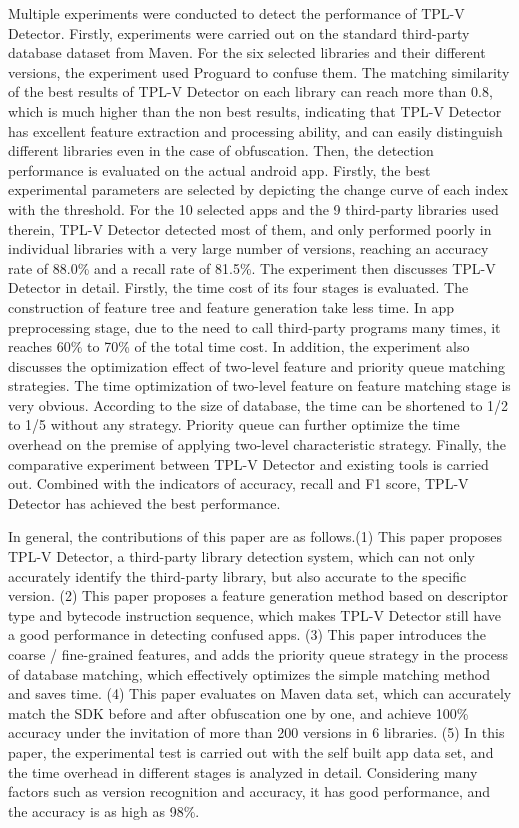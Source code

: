 \begin{digest}
Multiple experiments were conducted to detect the performance of TPL-V Detector. Firstly, experiments were carried out on the standard third-party database dataset from Maven. For the six selected libraries and their different versions, the experiment used Proguard to confuse them. The matching similarity of the best results of TPL-V Detector on each library can reach more than 0.8, which is much higher than the non best results, indicating that TPL-V Detector has excellent feature extraction and processing ability, and can easily distinguish different libraries even in the case of obfuscation. Then, the detection performance is evaluated on the actual android app. Firstly, the best experimental parameters are selected by depicting the change curve of each index with the threshold. For the 10 selected apps and the 9 third-party libraries used therein, TPL-V Detector detected most of them, and only performed poorly in individual libraries with a very large number of versions, reaching an accuracy rate of 88.0\% and a recall rate of 81.5\%. The experiment then discusses TPL-V Detector in detail. Firstly, the time cost of its four stages is evaluated. The construction of feature tree and feature generation take less time. In app preprocessing stage, due to the need to call third-party programs many times, it reaches 60\% to 70\% of the total time cost. In addition, the experiment also discusses the optimization effect of two-level feature and priority queue matching strategies. The time optimization of two-level feature on feature matching stage is very obvious. According to the size of database, the time can be shortened to 1/2 to 1/5 without any strategy. Priority queue can further optimize the time overhead on the premise of applying two-level characteristic strategy. Finally, the comparative experiment between TPL-V Detector and existing tools is carried out. Combined with the indicators of accuracy, recall and F1 score, TPL-V Detector has achieved the best performance.



In general, the contributions of this paper are as follows.(1) This paper proposes TPL-V Detector, a third-party library detection system, which can not only accurately identify the third-party library, but also accurate to the specific version. (2) This paper proposes a feature generation method based on descriptor type and bytecode instruction sequence, which makes TPL-V Detector still have a good performance in detecting confused apps. (3) This paper introduces the coarse / fine-grained features, and adds the priority queue strategy in the process of database matching, which effectively optimizes the simple matching method and saves time. (4) This paper evaluates on Maven data set, which can accurately match the SDK before and after obfuscation one by one, and achieve 100\% accuracy under the invitation of more than 200 versions in 6 libraries. (5) In this paper, the experimental test is carried out with the self built app data set, and the time overhead in different stages is analyzed in detail. Considering many factors such as version recognition and accuracy, it has good performance, and the accuracy is as high as 98\%.




\end{digest}
